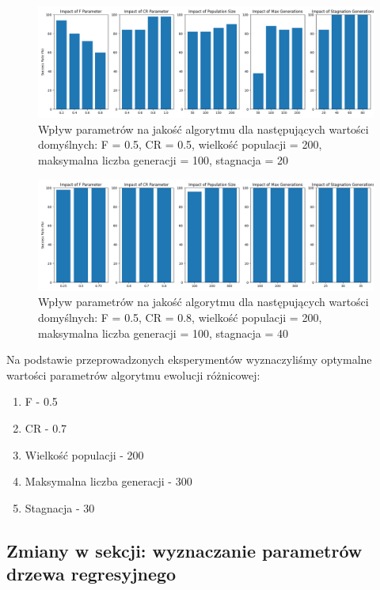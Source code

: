 \documentclass{article}
\begin{document}
\begin{figure}[H]
    \centering
    \includegraphics[width=\textwidth]{parameter_tuning_results_separate3.png}
    \caption{Wpływ parametrów na jakość algorytmu dla następujących wartości domyślnych: F = 0.5, CR = 0.5, wielkość populacji = 200, maksymalna liczba generacji = 100, stagnacja = 20}
    \label{fig:parameter_results3}
\end{figure}

\begin{figure}[H]
    \centering
    \includegraphics[width=\textwidth]{parameter_tuning_results_separate4.png}
    \caption{Wpływ parametrów na jakość algorytmu dla następujących wartości domyślnych: F = 0.5, CR = 0.8, wielkość populacji = 200, maksymalna liczba generacji = 100, stagnacja = 40}
    \label{fig:parameter_results4}
\end{figure}

Na podstawie przeprowadzonych eksperymentów wyznaczyliśmy optymalne wartości parametrów algorytmu ewolucji różnicowej:
\begin{enumerate}
    \item F - 0.5
    \item CR - 0.7
    \item Wielkość populacji - 200
    \item Maksymalna liczba generacji - 300
    \item Stagnacja - 30
\end{enumerate}

\subsection{Zmiany w sekcji: wyznaczanie parametrów drzewa regresyjnego}
\end{document}
